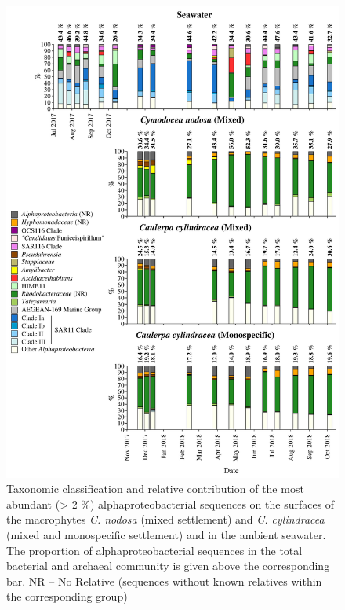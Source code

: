 \documentclass[12pt,]{article}
\begin{document}
\begin{figure}[H]

{\centering \includegraphics[width=0.85\linewidth]{../results/figures/alphaproteobacteria_bar_plot} 

}

\caption{Taxonomic classification and relative contribution of the most abundant (> 2 \si{\percent}) alphaproteobacterial sequences on the surfaces of the macrophytes \textit{C. nodosa} (mixed settlement) and \textit{C. cylindracea} (mixed and monospecific settlement) and in the ambient seawater. The proportion of alphaproteobacterial sequences in the total bacterial and archaeal community is given above the corresponding bar. NR -- No Relative (sequences without known relatives within the corresponding group)\label{alpha}}\label{fig:unnamed-chunk-7}
\end{figure}
\end{document}
